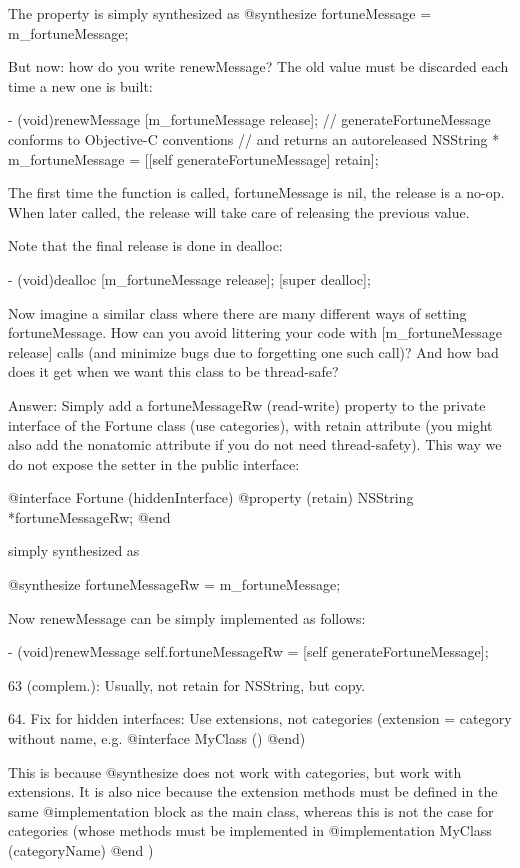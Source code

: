 The property is simply synthesized as
@synthesize fortuneMessage = m_fortuneMessage;

But now: how do you write renewMessage? The old value must be discarded each
time a new one is built:

- (void)renewMessage
{
   [m_fortuneMessage release];
   // generateFortuneMessage conforms to Objective-C conventions
   // and returns an autoreleased NSString *
   m_fortuneMessage = [[self generateFortuneMessage] retain];
}

The first time the function is called, fortuneMessage is nil, the release is
a no-op. When later called, the release will take care of releasing the
previous value.

Note that the final release is done in dealloc:

- (void)dealloc
{
   [m_fortuneMessage release];
   [super dealloc];
}

Now imagine a similar class where there are many different ways of setting
fortuneMessage. How can you avoid littering your code with [m_fortuneMessage
release] calls (and minimize bugs due to forgetting one such call)? And how
bad does it get when we want this class to be thread-safe?

Answer: Simply add a fortuneMessageRw (read-write) property to the private
interface of the Fortune class (use categories), with retain attribute (you
might also add the nonatomic attribute if you do not need thread-safety).
This way we do not expose the setter in the public interface:

@interface Fortune (hiddenInterface)
@property (retain) NSString *fortuneMessageRw;
@end

simply synthesized as

@synthesize fortuneMessageRw = m_fortuneMessage;

Now renewMessage can be simply implemented as follows:

- (void)renewMessage
{
   self.fortuneMessageRw = [self generateFortuneMessage];
}

63 (complem.): Usually, not retain for NSString, but copy.

64. Fix for hidden interfaces: Use extensions, not categories (extension =
category without name, e.g. @interface MyClass () @end)

This is because @synthesize does not work with categories, but work with
extensions. It is also nice because the extension methods must be defined in
the same @implementation block as the main class, whereas this is not the
case for categories (whose methods must be implemented in @implementation
MyClass (categoryName) @end )

